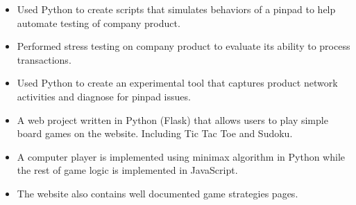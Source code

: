 \documentclass[10pt,a4paper]{altacv}
\begin{document}

\begin{fullwidth}
\makecvheader
\end{fullwidth}


\marginpar{\vspace*{-85pt}\raggedright}


\begin{itemize}
\item Used Python to create scripts that simulates behaviors of a pinpad to help automate testing of company product.
\item Performed stress testing on company product to evaluate its ability to process transactions.
\item Used Python to create an experimental tool that captures product network activities and diagnose for pinpad issues.
\end{itemize}



\begin{itemize}
    \item A web project written in Python (Flask) that allows users to play simple board games on the website. Including Tic Tac Toe and Sudoku.
    \item A computer player is implemented using minimax algorithm in Python while the rest of game logic is implemented in JavaScript.
    \item The website also contains well documented game strategies pages.
\end{itemize}
\end{document}
